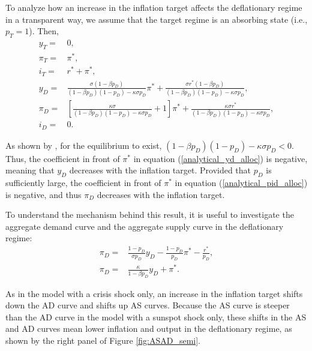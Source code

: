 \documentclass[11pt]{article}
\begin{document}
\begin{singlespace}
		
		
		To analyze how an increase in the inflation target affects the deflationary regime in a transparent way, we assume that the target regime is an absorbing state (i.e., $p_{T}=1$). Then,
		\begin{align}
			y_T =& 0,  \\
			\pi_T =& \pi^*, \\
			i_T =& r^* + \pi^*, \\
			y_D =& \frac{\sigma(1-\beta p_D)}{(1-\beta p_D)(1-p_D) -\kappa\sigma p_D}\pi^{*} + \frac{\sigma r^*(1-\beta p_D)}{(1-\beta p_D)(1-p_D) -\kappa\sigma p_D},\label{analytical_yd_alloc}\\
			\pi_D =& \left[\frac{\kappa\sigma}{(1-\beta p_D)(1-p_D) -\kappa\sigma p_D} + 1\right]\pi^*+\frac{\kappa\sigma r^*}{(1-\beta p_D)(1-p_D) -\kappa\sigma p_D},\label{analytical_pid_alloc}\\	
			i_D =& 0.
		\end{align}
		
		\noindent As shown by \citet{NakataSchmidt2019}, for the equilibrium to exist, $(1-\beta p_D)(1-p_D) -\kappa\sigma p_D <0$. Thus, the coefficient in front of $\pi^*$ in equation (\ref{analytical_yd_alloc}) is negative, meaning that $y_D$ decreases with the inflation target. Provided that $p_{D}$ is sufficiently large, the coefficient in front of $\pi^*$ in equation (\ref{analytical_pid_alloc}) is negative, and thus $\pi_D$ decreases with the inflation target. 
		
		To understand the mechanism behind this result, it is useful to investigate the aggregate demand curve and the aggregate supply curve in the deflationary regime:
		\begin{align}
			\pi_D =& \frac{1-p_D}{\sigma p_D}y_D - \frac{1-p_D}{p_D}\pi^* - \frac{r^*}{p_D},\\
			\pi_D =& \frac{\kappa }{1-\beta p_D}y_D+\pi^*.
		\end{align}
		
		\noindent As in the model with a crisis shock only, an increase in the inflation target shifts down the AD curve and shifts up AS curves. Because the AS curve is steeper than the AD curve in the model with a sunspot shock only, these shifts in the AS and AD curves mean lower inflation and output in the deflationary regime, as shown by the right panel of Figure \ref{fig:ASAD_semi}. 
		

\end{singlespace}
\end{document}
